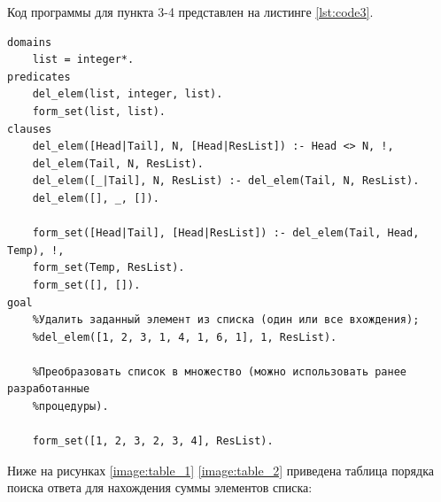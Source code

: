 Код программы для пункта 3-4 представлен на листинге \ref{lst:code3}.
\begin{lstlisting}[label=lst:code3, basicstyle=\footnotesize, caption=Код программы (пункт 3)]
domains
	list = integer*.
predicates
	del_elem(list, integer, list).
	form_set(list, list).
clauses
	del_elem([Head|Tail], N, [Head|ResList]) :- Head <> N, !, 
	del_elem(Tail, N, ResList).
	del_elem([_|Tail], N, ResList) :- del_elem(Tail, N, ResList).
	del_elem([], _, []).
	
	form_set([Head|Tail], [Head|ResList]) :- del_elem(Tail, Head, Temp), !, 
	form_set(Temp, ResList).
	form_set([], []).
goal
	%Удалить заданный элемент из списка (один или все вхождения);
	%del_elem([1, 2, 3, 1, 4, 1, 6, 1], 1, ResList).
	
	%Преобразовать список в множество (можно использовать ранее разработанные
	%процедуры).

	form_set([1, 2, 3, 2, 3, 4], ResList). 
\end{lstlisting}

Ниже на рисунках \ref{image:table_1} \ref{image:table_2} приведена таблица порядка поиска ответа для нахождения суммы элементов списка:
\begin{figure}[H]
\end{figure}

